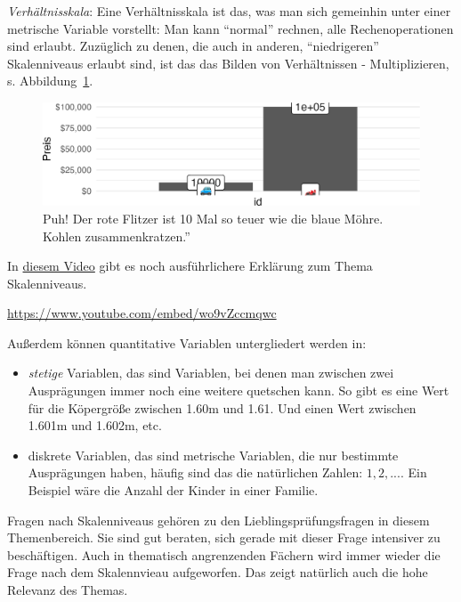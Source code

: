 \documentclass[
  a4paper,
  DIV=11]{scrreprt}
\providecommand{\tightlist}{%
  \setlength{\itemsep}{0pt}\setlength{\parskip}{0pt}}\usepackage{longtable,booktabs,array}
\theoremstyle{definition}
\theoremstyle{definition}
\theoremstyle{remark}
\begin{document}
\emph{Verhältnisskala}: Eine Verhältnisskala ist das, was man sich
gemeinhin unter einer metrische Variable vorstellt: Man kann ``normal''
rechnen, alle Rechenoperationen sind erlaubt. Zuzüglich zu denen, die
auch in anderen, ``niedrigeren'' Skalenniveaus erlaubt sind, ist das das
Bilden von Verhältnissen - Multiplizieren, s.
Abbildung~\ref{fig-verhaeltnis}.

\begin{figure}

{\centering \includegraphics{./fragenstellen_files/figure-pdf/fig-verhaeltnis-1.png}

}

\caption{\label{fig-verhaeltnis}Puh! Der rote Flitzer ist 10 Mal so
teuer wie die blaue Möhre. Kohlen zusammenkratzen.''}

\end{figure}

In \href{https://www.youtube.com/watch?v=_mN3kFe56ng}{diesem Video} gibt
es noch ausführlichere Erklärung zum Thema Skalenniveaus.

\url{https://www.youtube.com/embed/wo9vZccmqwc}

Außerdem können quantitative Variablen untergliedert werden in:

\begin{itemize}
\tightlist
\item
  \emph{stetige} Variablen, das sind Variablen, bei denen man zwischen
  zwei Ausprägungen immer noch eine weitere quetschen kann. So gibt es
  eine Wert für die Köpergröße zwischen 1.60m und 1.61. Und einen Wert
  zwischen 1.601m und 1.602m, etc.
\item
  diskrete Variablen, das sind metrische Variablen, die nur bestimmte
  Ausprägungen haben, häufig sind das die natürlichen Zahlen:
  \(1,2,...\). Ein Beispiel wäre die Anzahl der Kinder in einer Familie.
\end{itemize}

\begin{tcolorbox}[enhanced jigsaw, titlerule=0mm, bottomrule=.15mm, opacitybacktitle=0.6, colframe=quarto-callout-tip-color-frame, title=\textcolor{quarto-callout-tip-color}{\faLightbulb}\hspace{0.5em}{Tipp}, coltitle=black, colback=white, arc=.35mm, breakable, toptitle=1mm, opacityback=0, bottomtitle=1mm, left=2mm, leftrule=.75mm, rightrule=.15mm, toprule=.15mm, colbacktitle=quarto-callout-tip-color!10!white]

Fragen nach Skalenniveaus gehören zu den Lieblingsprüfungsfragen in
diesem Themenbereich. Sie sind gut beraten, sich gerade mit dieser Frage
intensiver zu beschäftigen. Auch in thematisch angrenzenden Fächern wird
immer wieder die Frage nach dem Skalennvieau aufgeworfen. Das zeigt
natürlich auch die hohe Relevanz des Themas.

\end{tcolorbox}
\end{document}
